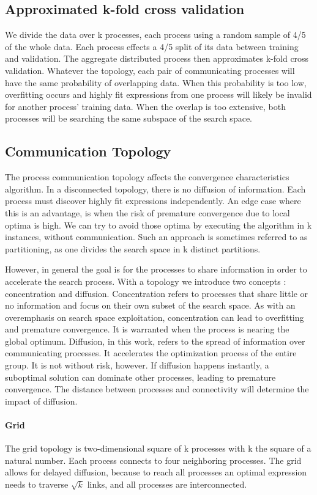 \subsection{Approximated k-fold cross validation}
We divide the data over k processes, each process using a random sample of 4/5 of the whole data. Each process effects a 4/5 split of its data between training and validation. The aggregate distributed process then approximates k-fold cross validation. Whatever the topology, each pair of communicating processes will have the same probability of overlapping data. When this probability is too low, overfitting occurs and highly fit expressions from one process will likely be invalid for another process' training data. When the overlap is too extensive, both processes will be searching the same subspace of the search space.
\subsection{Communication Topology}
The process communication topology affects the convergence characteristics algorithm. In a disconnected topology, there is no diffusion of information. Each process must discover highly fit expressions independently. An edge case where this is an advantage, is when the risk of premature convergence due to local optima is high. We can try to avoid those optima by executing the algorithm in k instances, without communication. Such an approach is sometimes referred to as partitioning, as one divides the search space in k distinct partitions.

However, in general the goal is for the processes to share information in order to accelerate the search process. With a topology we introduce two concepts : concentration and diffusion. Concentration refers to processes that share little or no information and focus on their own subset of the search space. As with an overemphasis on search space exploitation, concentration can lead to overfitting and premature convergence. It is warranted when the process is nearing the global optimum. Diffusion, in this work, refers to the spread of information over communicating processes. It accelerates the optimization process of the entire group. It is not without risk, however. If diffusion happens instantly, a suboptimal solution can dominate other processes, leading to premature convergence. The distance between processes and connectivity will determine the impact of diffusion.
\paragraph{Grid}
The grid topology is two-dimensional square of k processes with k the square of a natural number. Each process connects to four neighboring processes. The grid allows for delayed diffusion, because to reach all processes an optimal expression needs to traverse $\sqrt{k}$ links, and all processes are interconnected.
